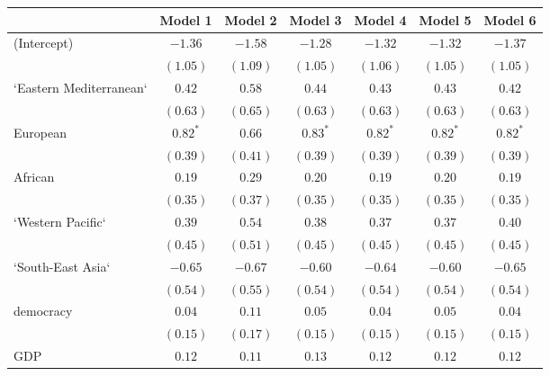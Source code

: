 
\begin{table}[!h]
\begin{center}
\begin{tabular}{l c c c c c c }
\toprule
 & Model 1 & Model 2 & Model 3 & Model 4 & Model 5 & Model 6 \\
\midrule
(Intercept)             & $-1.36$      & $-1.58$      & $-1.28$      & $-1.32$      & $-1.32$      & $-1.37$      \\
                        & $(1.05)$     & $(1.09)$     & $(1.05)$     & $(1.06)$     & $(1.05)$     & $(1.05)$     \\
`Eastern Mediterranean` & $0.42$       & $0.58$       & $0.44$       & $0.43$       & $0.43$       & $0.42$       \\
                        & $(0.63)$     & $(0.65)$     & $(0.63)$     & $(0.63)$     & $(0.63)$     & $(0.63)$     \\
European                & $0.82^{*}$   & $0.66$       & $0.83^{*}$   & $0.82^{*}$   & $0.82^{*}$   & $0.82^{*}$   \\
                        & $(0.39)$     & $(0.41)$     & $(0.39)$     & $(0.39)$     & $(0.39)$     & $(0.39)$     \\
African                 & $0.19$       & $0.29$       & $0.20$       & $0.19$       & $0.20$       & $0.19$       \\
                        & $(0.35)$     & $(0.37)$     & $(0.35)$     & $(0.35)$     & $(0.35)$     & $(0.35)$     \\
`Western Pacific`       & $0.39$       & $0.54$       & $0.38$       & $0.37$       & $0.37$       & $0.40$       \\
                        & $(0.45)$     & $(0.51)$     & $(0.45)$     & $(0.45)$     & $(0.45)$     & $(0.45)$     \\
`South-East Asia`       & $-0.65$      & $-0.67$      & $-0.60$      & $-0.64$      & $-0.60$      & $-0.65$      \\
                        & $(0.54)$     & $(0.55)$     & $(0.54)$     & $(0.54)$     & $(0.54)$     & $(0.54)$     \\
democracy               & $0.04$       & $0.11$       & $0.05$       & $0.04$       & $0.05$       & $0.04$       \\
                        & $(0.15)$     & $(0.17)$     & $(0.15)$     & $(0.15)$     & $(0.15)$     & $(0.15)$     \\
GDP                     & $0.12$       & $0.11$       & $0.13$       & $0.12$       & $0.12$       & $0.12$       \\

\end{tabular}
\end{center}
\end{table}
